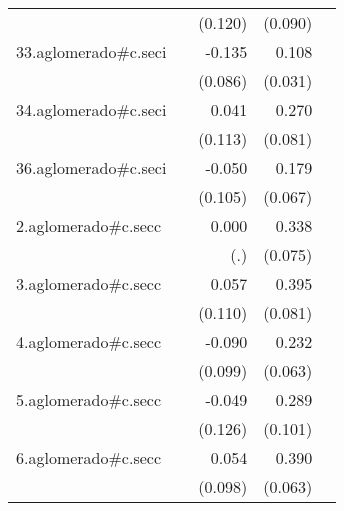 {\begin{longtable}{l*{4}{D{.}{.}{-1}}}
            &                     &     (0.120)         &     (0.090)         &                     \\
\addlinespace
33.aglomerado#c.seci&                     &      -0.135         &       0.108\sym{***}&                     \\
            &                     &     (0.086)         &     (0.031)         &                     \\
\addlinespace
34.aglomerado#c.seci&                     &       0.041         &       0.270\sym{***}&                     \\
            &                     &     (0.113)         &     (0.081)         &                     \\
\addlinespace
36.aglomerado#c.seci&                     &      -0.050         &       0.179\sym{**} &                     \\
            &                     &     (0.105)         &     (0.067)         &                     \\
\addlinespace
2.aglomerado#c.secc&                     &       0.000         &       0.338\sym{***}&                     \\
            &                     &         (.)         &     (0.075)         &                     \\
\addlinespace
3.aglomerado#c.secc&                     &       0.057         &       0.395\sym{***}&                     \\
            &                     &     (0.110)         &     (0.081)         &                     \\
\addlinespace
4.aglomerado#c.secc&                     &      -0.090         &       0.232\sym{***}&                     \\
            &                     &     (0.099)         &     (0.063)         &                     \\
\addlinespace
5.aglomerado#c.secc&                     &      -0.049         &       0.289\sym{**} &                     \\
            &                     &     (0.126)         &     (0.101)         &                     \\
\addlinespace
6.aglomerado#c.secc&                     &       0.054         &       0.390\sym{***}&                     \\
            &                     &     (0.098)         &     (0.063)         &                     \\

\end{longtable}}
